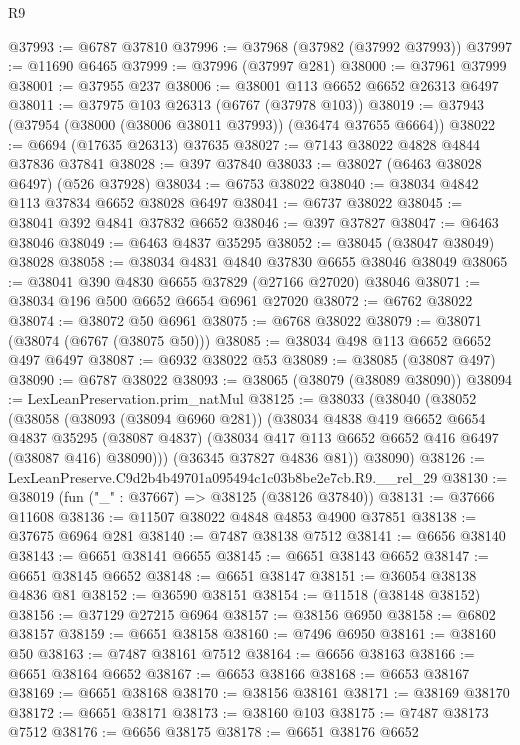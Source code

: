 \begin{lexlean}{R9}
\begin{coremodule}
@37993 := @6787 @37810
@37996 := @37968 (@37982 (@37992 @37993))
@37997 := @11690 @6465
@37999 := @37996 (@37997 @281)
@38000 := @37961 @37999
@38001 := @37955 @237
@38006 := @38001 @113 @6652 @6652 @26313 @6497
@38011 := @37975 @103 @26313 (@6767 (@37978 @103))
@38019 := @37943 (@37954 (@38000 (@38006 @38011 @37993)) (@36474 @37655 @6664))
@38022 := @6694 (@17635 @26313) @37635
@38027 := @7143 @38022 @4828 @4844 @37836 @37841
@38028 := @397 @37840
@38033 := @38027 (@6463 @38028 @6497) (@526 @37928)
@38034 := @6753 @38022
@38040 := @38034 @4842 @113 @37834 @6652 @38028 @6497
@38041 := @6737 @38022
@38045 := @38041 @392 @4841 @37832 @6652
@38046 := @397 @37827
@38047 := @6463 @38046
@38049 := @6463 @4837 @35295
@38052 := @38045 (@38047 @38049) @38028
@38058 := @38034 @4831 @4840 @37830 @6655 @38046 @38049
@38065 := @38041 @390 @4830 @6655 @37829 (@27166 @27020) @38046
@38071 := @38034 @196 @500 @6652 @6654 @6961 @27020
@38072 := @6762 @38022
@38074 := @38072 @50 @6961
@38075 := @6768 @38022
@38079 := @38071 (@38074 (@6767 (@38075 @50)))
@38085 := @38034 @498 @113 @6652 @6652 @497 @6497
@38087 := @6932 @38022 @53
@38089 := @38085 (@38087 @497)
@38090 := @6787 @38022
@38093 := @38065 (@38079 (@38089 @38090))
@38094 := LexLeanPreservation.prim_natMul
@38125 := @38033
    (@38040
      (@38052
        (@38058
          (@38093 (@38094 @6960 @281))
          (@38034
            @4838
            @419
            @6652
            @6654
            @4837
            @35295
            (@38087 @4837)
            (@38034 @417 @113 @6652 @6652 @416 @6497 (@38087 @416) @38090)))
        (@36345 @37827 @4836 @81))
      @38090)
@38126 := LexLeanPreserve.C9d2b4b49701a095494c1c03b8be2e7cb.R9.__rel_29
@38130 := @38019 (fun ("_" : @37667) => @38125 (@38126 @37840))
@38131 := @37666 @11608
@38136 := @11507 @38022 @4848 @4853 @4900 @37851
@38138 := @37675 @6964 @281
@38140 := @7487 @38138 @7512
@38141 := @6656 @38140
@38143 := @6651 @38141 @6655
@38145 := @6651 @38143 @6652
@38147 := @6651 @38145 @6652
@38148 := @6651 @38147
@38151 := @36054 @38138 @4836 @81
@38152 := @36590 @38151
@38154 := @11518 (@38148 @38152)
@38156 := @37129 @27215 @6964
@38157 := @38156 @6950
@38158 := @6802 @38157
@38159 := @6651 @38158
@38160 := @7496 @6950
@38161 := @38160 @50
@38163 := @7487 @38161 @7512
@38164 := @6656 @38163
@38166 := @6651 @38164 @6652
@38167 := @6653 @38166
@38168 := @6653 @38167
@38169 := @6651 @38168
@38170 := @38156 @38161
@38171 := @38169 @38170
@38172 := @6651 @38171
@38173 := @38160 @103
@38175 := @7487 @38173 @7512
@38176 := @6656 @38175
@38178 := @6651 @38176 @6652

\end{coremodule}
\end{lexlean}
